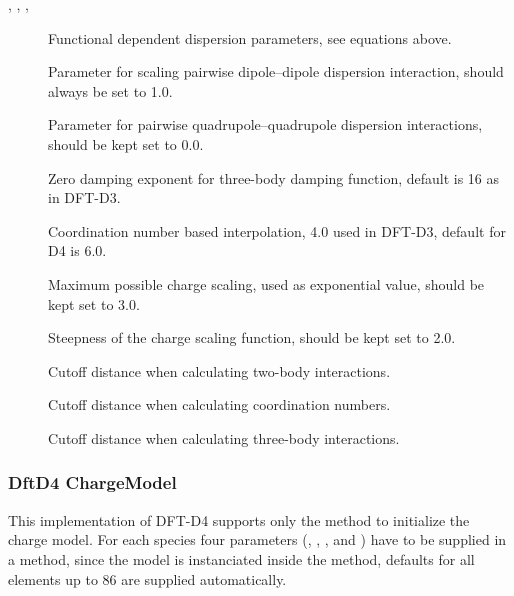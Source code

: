 \begin{description}
\item[, , , ] Functional dependent dispersion
  parameters, see equations above.
  
\item[] Parameter for scaling pairwise dipole--dipole dispersion
  interaction, should always be set to 1.0.

\item[] Parameter for pairwise quadrupole--quadrupole dispersion
  interactions, should be kept set to 0.0.

\item[] Zero damping exponent for three-body damping function, default
  is 16 as in DFT-D3.

\item[] Coordination number based interpolation, 4.0 used in
  DFT-D3, default for D4 is 6.0.

\item[] Maximum possible charge scaling, used as exponential
  value, should be kept set to 3.0.

\item[] Steepness of the charge scaling function, should be
  kept set to 2.0.

\item[]  Cutoff distance when
  calculating two-body interactions.

\item[]  Cutoff distance when
  calculating coordination numbers.

\item[]  Cutoff distance when
  calculating three-body interactions.

\end{description}

\subsubsection{DftD4 ChargeModel}

This implementation of DFT-D4 supports only the  method to initialize
the charge model. For each species four parameters (, , ,
and ) have to be supplied in a  method, since the model
is instanciated inside the  method, defaults for all elements up to
86 are supplied automatically.

